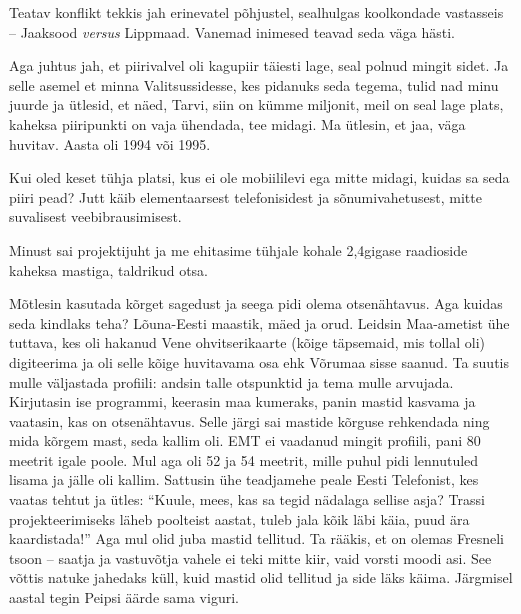 Teatav konflikt tekkis jah erinevatel põhjustel, sealhulgas 
koolkondade vastasseis – Jaaksood \emph{versus} Lippmaad. Vanemad inimesed 
teavad seda väga hästi.

Aga juhtus jah, et piirivalvel oli kagupiir täiesti lage, 
seal polnud mingit sidet. Ja selle asemel et minna 
Valitsussidesse, kes pidanuks seda tegema, tulid nad minu juurde ja ütlesid, 
et näed, Tarvi, siin on kümme miljonit, meil on seal lage 
plats, kaheksa piiripunkti on vaja ühendada, tee midagi. Ma ütlesin, et jaa, väga huvitav. Aasta oli 1994 või 1995.


Kui oled keset tühja platsi, kus ei ole 
mobiililevi ega mitte midagi, kuidas sa seda piiri pead? Jutt käib elementaarsest telefonisidest ja sõnumivahetusest, mitte suvalisest veebibrausimisest.

Minust sai projektijuht ja me ehitasime tühjale kohale 2,4gigase raadioside
kaheksa mastiga, taldrikud otsa.


Mõtlesin kasutada 
kõrget sagedust ja seega pidi olema otsenähtavus. Aga kuidas seda 
kindlaks teha? Lõuna-Eesti maastik, mäed ja orud. Leidsin 
Maa-ametist ühe tuttava, kes oli hakanud 
Vene ohvitserikaarte (kõige täpsemaid, mis tollal oli) digiteerima ja oli 
selle kõige huvitavama osa ehk Võrumaa sisse saanud. Ta suutis mulle 
väljastada profiili: andsin talle otspunktid ja tema mulle arvujada. Kirjutasin ise programmi, keerasin maa kumeraks, panin mastid kasvama ja 
vaatasin, kas on otsenähtavus. Selle järgi sai mastide kõrguse 
rehkendada ning mida kõrgem mast, seda kallim oli. 
EMT ei 
vaadanud mingit profiili, pani 80 meetrit igale poole. Mul aga oli 
52 ja 54 meetrit, mille puhul pidi 
lennutuled lisama ja jälle oli kallim. Sattusin ühe teadjamehe peale 
Eesti Telefonist, kes vaatas tehtut ja ütles: 
\enquote{Kuule, mees, kas sa tegid nädalaga sellise asja? Trassi projekteerimiseks 
läheb poolteist aastat, tuleb jala kõik läbi käia, puud ära kaardistada!} Aga 
mul olid juba mastid tellitud. Ta rääkis, et on olemas Fresneli tsoon – 
saatja ja vastuvõtja vahele ei teki mitte kiir, vaid vorsti moodi 
asi. See võttis natuke jahedaks 
küll, kuid mastid olid tellitud ja side läks käima. Järgmisel aastal tegin Peipsi 
äärde sama viguri. 

